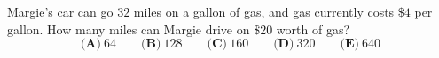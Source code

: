 Margie's car can go $32$ miles on a gallon of gas, and gas currently costs $\$4$ per gallon. How many miles can Margie drive on $\$20$ worth of gas?
\[\textbf{(A)}\ 64\qquad\textbf{(B)}\ 128\qquad\textbf{(C)}\ 160\qquad\textbf{(D)}\ 320\qquad\textbf{(E)}\ 640\]
